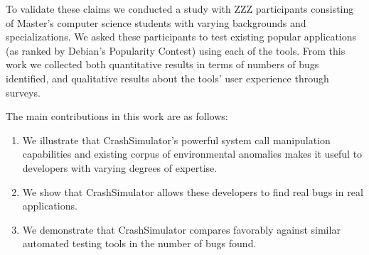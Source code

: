 To validate these claims we conducted a study with ZZZ participants
consisting of Master's computer science students with varying backgrounds
and specializations.  We asked these participants to test existing popular
applications (as ranked by Debian's Popularity Contest) using each of the
tools.  From this work we collected both quantitative results in terms of
numbers of bugs identified, and qualitative results about the tools' user
experience through surveys.

The main contributions in this work are as follows:
\begin{enumerate}

\item We illustrate that CrashSimulator's powerful system call manipulation
    capabilities and existing corpus of environmental anomalies makes it
        useful to developers with varying degrees of expertise.

\item We show that CrashSimulator allows these developers to find real bugs
in real applications.

\item We demonstrate that CrashSimulator compares favorably against similar
automated testing tools in the number of bugs found.

\end{enumerate}
